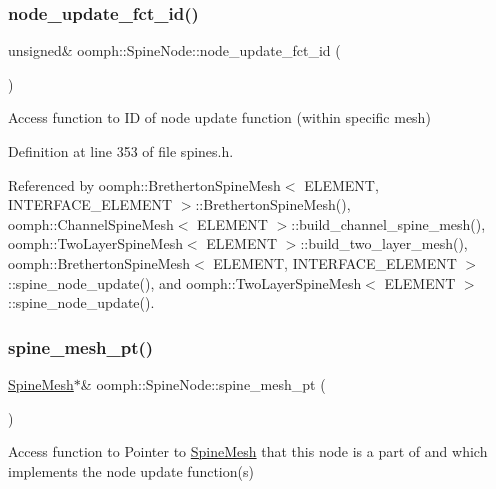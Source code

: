 \subsubsection{\texorpdfstring{node\+\_\+update\+\_\+fct\+\_\+id()}{node\_update\_fct\_id()}}
{\footnotesize\ttfamily unsigned\& oomph\+::\+Spine\+Node\+::node\+\_\+update\+\_\+fct\+\_\+id (\begin{DoxyParamCaption}{ }\end{DoxyParamCaption})\hspace{0.3cm}{\ttfamily [inline]}}



Access function to ID of node update function (within specific mesh) 



Definition at line 353 of file spines.\+h.



Referenced by oomph\+::\+Bretherton\+Spine\+Mesh$<$ E\+L\+E\+M\+E\+N\+T, I\+N\+T\+E\+R\+F\+A\+C\+E\+\_\+\+E\+L\+E\+M\+E\+N\+T $>$\+::\+Bretherton\+Spine\+Mesh(), oomph\+::\+Channel\+Spine\+Mesh$<$ E\+L\+E\+M\+E\+N\+T $>$\+::build\+\_\+channel\+\_\+spine\+\_\+mesh(), oomph\+::\+Two\+Layer\+Spine\+Mesh$<$ E\+L\+E\+M\+E\+N\+T $>$\+::build\+\_\+two\+\_\+layer\+\_\+mesh(), oomph\+::\+Bretherton\+Spine\+Mesh$<$ E\+L\+E\+M\+E\+N\+T, I\+N\+T\+E\+R\+F\+A\+C\+E\+\_\+\+E\+L\+E\+M\+E\+N\+T $>$\+::spine\+\_\+node\+\_\+update(), and oomph\+::\+Two\+Layer\+Spine\+Mesh$<$ E\+L\+E\+M\+E\+N\+T $>$\+::spine\+\_\+node\+\_\+update().

\mbox{\label{classoomph_1_1SpineNode_a6d7bf6495db8e7bb000ed2d48aaced4d}} 
\subsubsection{\texorpdfstring{spine\+\_\+mesh\+\_\+pt()}{spine\_mesh\_pt()}}
{\footnotesize\ttfamily \hyperlink{classoomph_1_1SpineMesh}{Spine\+Mesh}$\ast$\& oomph\+::\+Spine\+Node\+::spine\+\_\+mesh\+\_\+pt (\begin{DoxyParamCaption}{ }\end{DoxyParamCaption})\hspace{0.3cm}{\ttfamily [inline]}}



Access function to Pointer to \hyperlink{classoomph_1_1SpineMesh}{Spine\+Mesh} that this node is a part of and which implements the node update function(s) 



